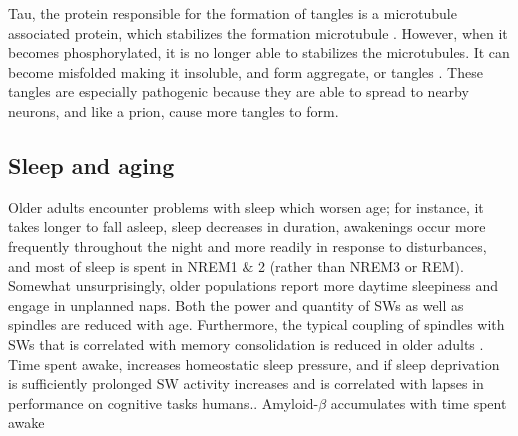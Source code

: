 Tau, the protein responsible for the formation of tangles is a microtubule associated protein, which stabilizes the formation microtubule \citep{Wang2016}. However, when it becomes phosphorylated, it is no longer able to stabilizes the microtubules. It can become misfolded making it insoluble, and form aggregate, or tangles \citep{Iqbal2016}. These tangles are especially pathogenic because they are able to spread to nearby neurons, and like a prion, cause more tangles to form.

\subsection*{Sleep and aging}
Older adults encounter problems with sleep which worsen age; for instance, it takes longer to fall asleep, sleep decreases in duration, awakenings occur more frequently throughout the night and more readily in response to disturbances, and most of sleep is spent in NREM1 $\&$ 2 (rather than NREM3 or REM). Somewhat unsurprisingly, older populations report more daytime sleepiness and engage in unplanned naps. Both the power and quantity of SWs as well as spindles are reduced with age.\citep{Mander2017} Furthermore, the typical coupling of spindles with SWs that is correlated with memory consolidation is reduced in older adults \citep{Helfrich2018}. Time spent awake, increases homeostatic sleep pressure, and if sleep deprivation is sufficiently prolonged SW activity increases and is correlated with lapses in performance on cognitive tasks humans.\citep{Rodriguez2016,Watson2016,Nir2017}. Amyloid-$\beta$ accumulates with time spent awake \citep{Bateman2006,Kang2009, Xie Mander2015}%


